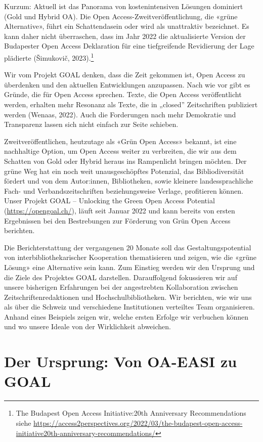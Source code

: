 \documentclass[a4paper,
fontsize=11pt,
oneside,
numbers=noperiodatend,
parskip=half-,
bibliography=totoc,
final
]{scrartcl}
\begin{document}
Kurzum: Aktuell ist das Panorama von kostenintensiven Lösungen dominiert
(Gold und Hybrid OA). Die Open Access-Zweitveröffentlichung, die «grüne
Alternative», führt ein Schattendasein oder wird als unattraktiv
bezeichnet. Es kann daher nicht überraschen, dass im Jahr 2022 die
aktualisierte Version der Budapester Open Access Deklaration für eine
tiefgreifende Revidierung der Lage plädierte (Šimukovič,
2023).\footnote{The Budapest Open Access Initiative:20th Anniversary
  Recommendations siehe
  \url{https://access2perspectives.org/2022/03/the-budapest-open-access-initiative20th-anniversary-recommendations/}}

Wir vom Projekt GOAL denken, dass die Zeit gekommen ist, Open Access zu
überdenken und den aktuellen Entwicklungen anzupassen. Nach wie vor gibt
es Gründe, die für Open Access sprechen. Texte, die Open Access
veröffentlicht werden, erhalten mehr Resonanz als Texte, die in
„closed'' Zeitschriften publiziert werden (Wenaas, 2022). Auch die
Forderungen nach mehr Demokratie und Transparenz lassen sich nicht
einfach zur Seite schieben.

Zweitveröffentlichen, heutzutage als «Grün Open Access» bekannt, ist
eine nachhaltige Option, um Open Access weiter zu verbreiten, die wir
aus dem Schatten von Gold oder Hybrid heraus ins Rampenlicht bringen
möchten. Der grüne Weg hat ein noch weit unausgeschöpftes Potenzial, das
Bibliodiversität fördert und von dem Autor:innen, Bibliotheken, sowie
kleinere landessprachliche Fach- und Verbandszeitschriften
beziehungsweise Verlage, profitieren können. Unser Projekt GOAL --
Unlocking the Green Open Access Potential (\url{https://opengoal.ch/}),
läuft seit Januar 2022 und kann bereits von ersten Ergebnissen bei den
Bestrebungen zur Förderung von Grün Open Access berichten.

Die Berichterstattung der vergangenen 20 Monate soll das
Gestaltungspotential von interbibliothekarischer Kooperation
thematisieren und zeigen, wie die «grüne Lösung» eine Alternative sein
kann. Zum Einstieg werden wir den Ursprung und die Ziele des Projektes
GOAL darstellen. Darauffolgend fokussieren wir auf unsere bisherigen
Erfahrungen bei der angestrebten Kollaboration zwischen
Zeitschriftenredaktionen und Hochschulbibliotheken. Wir berichten, wie
wir uns als über die Schweiz und verschiedene Institutionen verteiltes
Team organisieren. Anhand eines Beispiels zeigen wir, welche ersten
Erfolge wir verbuchen können und wo unsere Ideale von der Wirklichkeit
abweichen.

\hypertarget{der-ursprung-von-oa-easi-zu-goal}{%
\section{Der Ursprung: Von OA-EASI zu
GOAL}\label{der-ursprung-von-oa-easi-zu-goal}}
\end{document}
